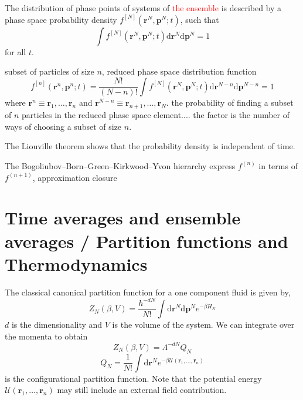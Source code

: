 The distribution of phase points of systems of \textcolor{red}{the
ensemble} is described by a phase space probability density $f^{[N]}(\mathbf{r}^{N},\mathbf{p}^{N};t)$,
such that 
\begin{equation}
\int f^{[N]}(\mathbf{r}^{N},\mathbf{p}^{N};t)\mathrm{d}\mathbf{r}^{N}\mathrm{d}\mathbf{p}^{N}=1
\end{equation}
for all $t$.

subset of particles of size $n$, reduced phase space distribution
function 
\begin{equation}
f^{[n]}(\mathbf{r}^{n},\mathbf{p}^{n};t)=\dfrac{N!}{(N-n)!}\int f^{[N]}(\mathbf{r}^{N},\mathbf{p}^{N};t)\mathrm{d}\mathbf{r}^{N-n}\mathrm{d}\mathbf{p}^{N-n}=1
\end{equation}
where $\mathbf{r}^{n}\equiv\mathbf{r}_{1},\ldots,\mathbf{r}_{n}$
and $\mathbf{r}^{N-n}\equiv\mathbf{r}_{n+1},\ldots,\mathbf{r}_{N}$.
the probability of finding a subset of $n$ particles in the reduced
phase space element.... the factor is the number of ways of choosing
a subset of size $n$.

The Liouville theorem shows that the probability density is independent
of time.

The Bogoliubov–Born–Green–Kirkwood–Yvon hierarchy express $f^{(n)}$
in terms of $f^{(n+1)}$, approximation closure


\section{Time averages and ensemble averages / Partition functions and Thermodynamics}

The classical canonical partition function for a one component fluid
is given by,
\begin{equation}
Z_{N}(\beta,V)=\dfrac{h^{-dN}}{N!}\int\mathrm{d}\mathbf{r}^{N}\mathrm{d}\mathbf{p}^{N}e^{-\beta H_{N}}
\end{equation}
$d$ is the dimensionality and $V$ is the volume of the system. We
can integrate over the momenta to obtain
\begin{equation}
Z_{N}(\beta,V)=\Lambda^{-dN}Q_{N}
\end{equation}
\begin{equation}
Q_{N}=\dfrac{1}{N!}\int\mathrm{d}\mathbf{r}^{N}e^{-\beta\mathcal{U}(\mathbf{r}_{1},\ldots,\mathbf{r}_{n})}
\end{equation}
is the configurational partition function. Note that the potential
energy $\mathcal{U}(\mathbf{r}_{1},\ldots,\mathbf{r}_{n})$ may still
include an external field contribution.

